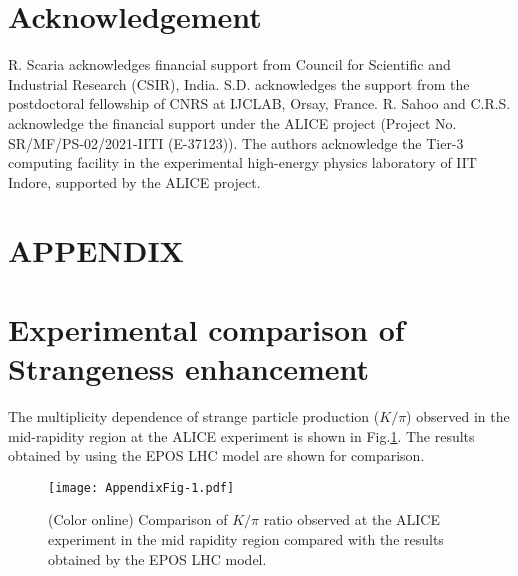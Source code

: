 \documentclass[aps,twocolumn,nofootinbib]{revtex4-1}
\begin{document}
\section*{Acknowledgement}
R. Scaria acknowledges financial support from Council for Scientific and Industrial Research (CSIR), India. S.D. acknowledges the support from the postdoctoral fellowship of CNRS at IJCLAB, Orsay, France. R. Sahoo and C.R.S. acknowledge the financial support under the ALICE project (Project No. SR/MF/PS-02/2021-IITI (E-37123)). The authors acknowledge the Tier-3 computing facility in the experimental high-energy physics laboratory of IIT Indore, supported by the ALICE project.


\section*{APPENDIX}
\appendix
\section{Experimental comparison of Strangeness enhancement}
\label{app_A}
The multiplicity dependence of strange particle production ($K/\pi$) observed in the mid-rapidity region at the ALICE experiment \cite{ALICE:2020nkc,ALICE:2018pal,ALICE:2013wgn,ALICE:2013mez,ALICE:2019hno} is shown in Fig.\ref{figapp1}. The results obtained by using the EPOS LHC model are shown for comparison. 
\begin{figure}[ht!]
\texttt{[image: AppendixFig-1.pdf]}
 \caption{(Color online) Comparison of $K/\pi$ ratio observed at the ALICE experiment \cite{ALICE:2020nkc,ALICE:2018pal,ALICE:2013wgn,ALICE:2013mez,ALICE:2019hno} in the mid rapidity region compared with the results obtained by the EPOS LHC model.}
\label{figapp1}
\end{figure}

\end{document}
